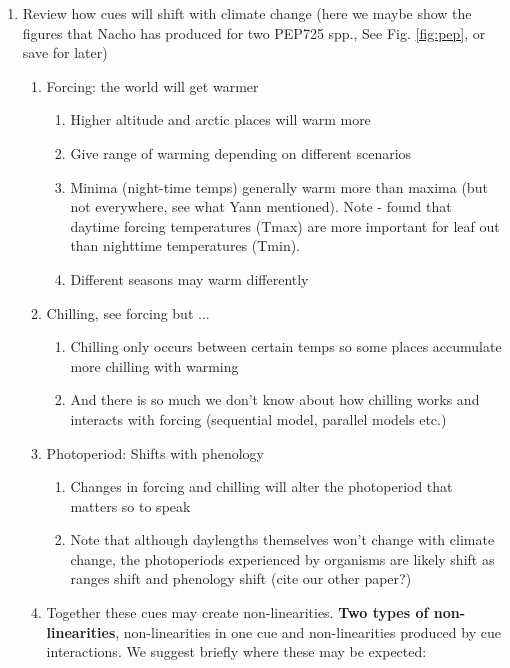 \documentclass[11pt,letterpaper]{article}
\begin{document}
\begin{enumerate}
\begin{enumerate}
\end{enumerate}
\item Review how cues will shift with climate change (here we maybe show the figures that Nacho has produced for two PEP725 spp., See Fig. \ref{fig:pep}, or save for later) %
\begin{enumerate}
\item Forcing: the world will get warmer 
\begin{enumerate}
\item Higher altitude and arctic places will warm more
\item Give range of warming depending on different scenarios
\item Minima (night-time temps) generally warm more than maxima (but not everywhere, see what Yann mentioned). Note \citet{piao2015}- found that daytime forcing temperatures (Tmax) are more important for leaf out than nighttime temperatures (Tmin).
\item Different seasons may warm differently
\end{enumerate}
\item Chilling, see forcing but ... 
\begin{enumerate}
\item Chilling only occurs between certain temps so some places accumulate more chilling with warming
\item And there is so much we don't know about how chilling works and interacts with forcing (sequential model, parallel models etc.)
\end{enumerate}
\item Photoperiod: Shifts with phenology
\begin{enumerate}
\item Changes in forcing and chilling will alter the photoperiod that matters so to speak
\item Note that although daylengths themselves won't change with climate change, the photoperiods experienced by organisms are likely shift as ranges shift and phenology shift (cite our other paper?)
\end{enumerate}
\item Together these cues may create non-linearities. {\bf Two types of non-linearities}, non-linearities in one cue and non-linearities produced by cue interactions.  We suggest briefly where these may be expected:

\end{enumerate}
\end{enumerate}
\end{document}
